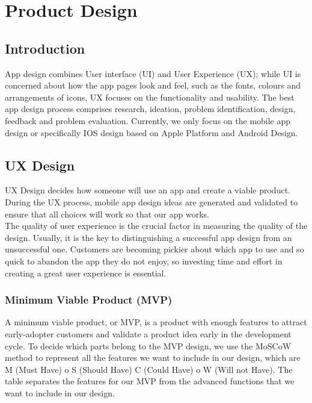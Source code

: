 


\chapter{Product Design} %

\label{Chapter2} %

\section{Introduction}
App design combines User interface (UI) and User Experience (UX); while UI is concerned about how the app pages look and feel, such as the fonts, colours and arrangements of icons, UX focuses on the functionality and usability. The best app design process comprises research, 
ideation, problem identification, design, feedback and problem evaluation. Currently, we only focus on the mobile app design or specifically IOS design based on Apple Platform and Android Design. 
\section{UX Design}
UX Design decides how someone will use an app and create a viable product. During the UX process, mobile app design ideas are generated and validated to ensure that all choices will work so that our app works. 
\\The quality of user experience is the crucial factor in measuring the quality of the design. Usually, it is the key to distinguishing a successful app design from an unsuccessful one. 
Customers are becoming pickier about which app to use and so quick to abandon the app they do not enjoy, so investing time and effort in creating a great user experience is essential.
\subsection{Minimum Viable Product (MVP)}
A minimum viable product, or MVP, is a product with enough features to attract early-adopter customers and validate a product idea early in the development cycle. To decide which parts belong to the MVP design, we use the MoSCoW method to represent all the features we want to include in our design, which are M (Must Have) o S (Should Have) C (Could Have) o W (Will not Have). 
The table separates the features for our MVP from the advanced functions that we want to include in our design.


